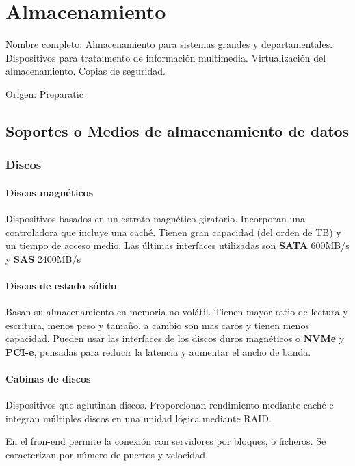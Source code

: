 \setcounter{section}{55} %
\section{Almacenamiento}

Nombre completo: Almacenamiento para sistemas grandes y departamentales. Dispositivos para trataimento de información multimedia. Virtualización del almacenamiento. Copias de seguridad.

Origen: Preparatic

\localtableofcontents

\subsection{Soportes o Medios de almacenamiento de datos}
    \subsubsection{Discos}
        \paragraph{Discos magnéticos}
            Dispositivos basados en un estrato magnético giratorio. Incorporan una controladora que incluye una caché. Tienen gran capacidad (del orden de TB) y un tiempo de acceso medio. Las últimas interfaces utilizadas son \textbf{SATA} 600MB/s y \textbf{SAS} 2400MB/s

        \paragraph{Discos de estado sólido}
            Basan su almacenamiento en memoria no volátil. Tienen mayor ratio de lectura y escritura, menos peso y tamaño, a cambio son mas caros y tienen menos capacidad. Pueden usar las interfaces de los discos duros magnéticos o \textbf{NVMe} y \textbf{PCI-e}, pensadas para reducir la latencia y aumentar el ancho de banda.

        \paragraph{Cabinas de discos}
            Dispositivos que aglutinan discos. Proporcionan rendimiento mediante caché e integran múltiples discos en una unidad lógica mediante RAID.

            En el fron-end permite la conexión con servidores por bloques, o ficheros. Se caracterizan por número de puertos y velocidad.

